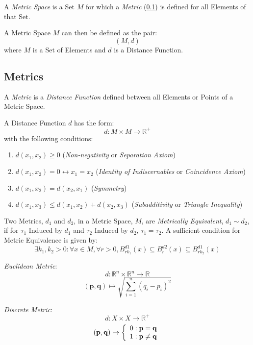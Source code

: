 \documentclass{article}
\begin{document}
A \emph{Metric Space} is a Set $M$ for which a \emph{Metric}
(\ref{subsec:metrics}) is defined for all Elements of that Set.

A Metric Space $M$ can then be defined as the pair:
\[
    (M,d)
\]
where $M$ is a Set of Elements and $d$ is a Distance Function.

\subsection{Metrics}\label{subsec:metrics}

A \emph{Metric} is a \emph{Distance Function} defined between all
Elements or Points of a Metric Space.

A Distance Function $d$ has the form:
\[
    d: M \times M \rightarrow \mathbb{R}^{+}
\]
with the following conditions:
\begin{enumerate}
\item $d(x_1, x_2) \geq 0$ (\emph{Non-negativity} or \emph{Separation
  Axiom})
\item $d(x_1, x_2) = 0 \leftrightarrow x_1 = x_2$ (\emph{Identity of
  Indiscernables} or \emph{Coincidence Axiom})
\item $d(x_1, x_2) = d(x_2, x_1)$ (\emph{Symmetry})
\item $d(x_1, x_3) \leq d(x_1, x_2) + d(x_2, x_3)$
  (\emph{Subadditivity} or \emph{Triangle Inequality})
\end{enumerate}
Two Metrics, $d_1$ and $d_2$, in a Metric Space, $M$, are
\emph{Metrically Equivalent}, $d_1 \sim d_2$, if for $\tau_1$ Induced
by $d_1$ and $\tau_2$ Induced by $d_2$, $\tau_1 = \tau_2$. A
sufficient condition for Metric Equivalence is given by:
\[
    \exists k_1, k_2 > 0 : \forall x \in M, \forall r > 0,
    B^{d1}_{rk_1}(x) \subseteq B^{d2}_r (x) \subseteq B^{d1}_{rk_2}(x)
\]

\emph{Euclidean Metric}:
\[
    d: \mathbb{R}^n \times \mathbb{R}^n \rightarrow \mathbb{R}
\]\[
    (\mathbf{p},\mathbf{q}) \mapsto \sqrt{\sum_{i=1}^{n}(q_i - p_i)^2}
\]

\emph{Discrete Metric}:
\[
    d: X \times X \rightarrow \mathbb{R}^{+}
\]\[
    (\mathbf{p},\mathbf{q}) \mapsto \left\{
    \begin{array}{l l}
        0: \mathbf{p} = \mathbf{q}\\
        1: \mathbf{p} \neq \mathbf{q}
    \end{array}\right.
\]
\end{document}
